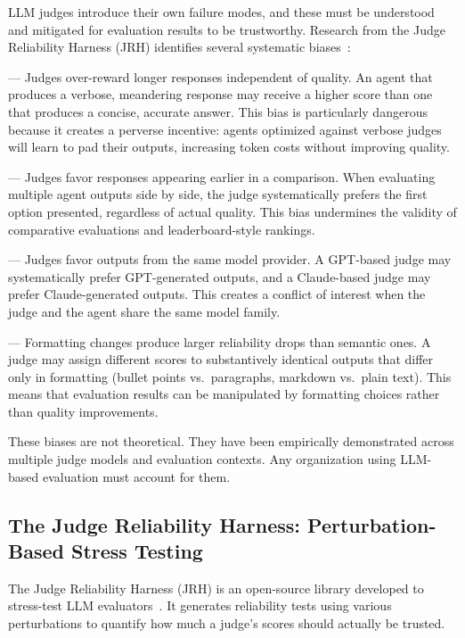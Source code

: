 LLM judges introduce their own failure modes, and these must be understood and mitigated for evaluation results to be trustworthy. Research from the Judge Reliability Harness (JRH) identifies several systematic biases~\citep{judge_reliability_harness}:

 --- Judges over-reward longer responses independent of quality. An agent that produces a verbose, meandering response may receive a higher score than one that produces a concise, accurate answer. This bias is particularly dangerous because it creates a perverse incentive: agents optimized against verbose judges will learn to pad their outputs, increasing token costs without improving quality.

 --- Judges favor responses appearing earlier in a comparison. When evaluating multiple agent outputs side by side, the judge systematically prefers the first option presented, regardless of actual quality. This bias undermines the validity of comparative evaluations and leaderboard-style rankings.

 --- Judges favor outputs from the same model provider. A GPT-based judge may systematically prefer GPT-generated outputs, and a Claude-based judge may prefer Claude-generated outputs. This creates a conflict of interest when the judge and the agent share the same model family.

 --- Formatting changes produce larger reliability drops than semantic ones. A judge may assign different scores to substantively identical outputs that differ only in formatting (bullet points vs.\ paragraphs, markdown vs.\ plain text). This means that evaluation results can be manipulated by formatting choices rather than quality improvements.

These biases are not theoretical. They have been empirically demonstrated across multiple judge models and evaluation contexts. Any organization using LLM-based evaluation must account for them.

\subsection{The Judge Reliability Harness: Perturbation-Based Stress Testing}

The Judge Reliability Harness (JRH) is an open-source library developed to stress-test LLM evaluators~\citep{judge_reliability_harness}. It generates reliability tests using various perturbations to quantify how much a judge's scores should actually be trusted.

